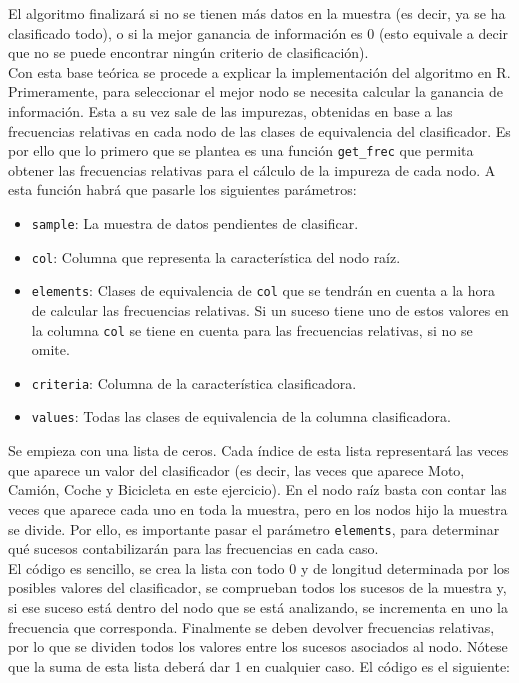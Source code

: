 \documentclass[12pt]{report}\usepackage[]{graphicx}\usepackage[dvipsnames]{xcolor}
\begin{document}
	 			El algoritmo finalizará si no se tienen más datos en la muestra (es decir, ya se ha clasificado todo), o si la mejor ganancia de información es 0 (esto equivale a decir que no se puede encontrar ningún criterio de clasificación).\\
	 			
	 			Con esta base teórica se procede a explicar la implementación del algoritmo en R. Primeramente, para seleccionar el mejor nodo se necesita calcular la ganancia de información. Esta a su vez sale de las impurezas, obtenidas en base a las frecuencias relativas en cada nodo de las clases de equivalencia del clasificador. Es por ello que lo primero que se plantea es una función \texttt{get\_frec} que permita obtener las frecuencias relativas para el cálculo de la impureza de cada nodo. A esta función habrá que pasarle los siguientes parámetros:
	 			
	 			\begin{itemize}
	 				\item \texttt{sample}: La muestra de datos pendientes de clasificar.
	 				\item \texttt{col}: Columna que representa la característica del nodo raíz.
	 				\item \texttt{elements}: Clases de equivalencia de \texttt{col} que se tendrán en cuenta a la hora de calcular las frecuencias relativas. Si un suceso tiene uno de estos valores en la columna \texttt{col} se tiene en cuenta para las frecuencias relativas, si no se omite. 
	 				\item \texttt{criteria}: Columna de la característica clasificadora.
	 				\item \texttt{values}: Todas las clases de equivalencia de la columna clasificadora.
	 			\end{itemize}
	 			
	 			Se empieza con una lista de ceros. Cada índice de esta lista representará las veces que aparece un valor del clasificador (es decir, las veces que aparece Moto, Camión, Coche y Bicicleta en este ejercicio). En el nodo raíz basta con contar las veces que aparece cada uno en toda la muestra, pero en los nodos hijo la muestra se divide. Por ello, es importante pasar el parámetro \texttt{elements}, para determinar qué sucesos contabilizarán para las frecuencias en cada caso.\\
	 			
	 			El código es sencillo, se crea la lista con todo 0 y de longitud determinada por los posibles valores del clasificador, se comprueban todos los sucesos de la muestra y, si ese suceso está dentro del nodo que se está analizando, se incrementa en uno la frecuencia que corresponda. Finalmente se deben devolver frecuencias relativas, por lo que se dividen todos los valores entre los sucesos asociados al nodo. Nótese que la suma de esta lista deberá dar 1 en cualquier caso. El código es el siguiente:
	 			
\end{document}
